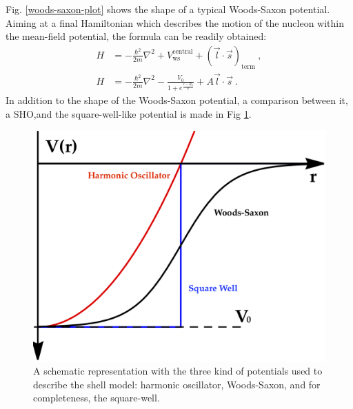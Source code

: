 Fig. \ref{woods-saxon-plot} shows the shape of a typical Woods-Saxon potential. Aiming at a final Hamiltonian which describes the motion of the nucleon within the mean-field potential, the formula can be readily obtained:
\begin{align}
    H&=-\frac{\hbar^2}{2m}\nabla^2+V_\text{ws}^\text{central}+(\vec{l}\cdot\vec{s})_\text{term}\ ,\\
    H&=-\frac{\hbar^2}{2m}\nabla^2-\frac{V_0}{1+e^{\frac{r-R_0}{a}}}+A\vec{l}\cdot\vec{s}\ .
\end{align}
In addition to the shape of the Woods-Saxon potential, a comparison between it, a SHO,and the square-well-like potential is made in Fig \ref{shell-model-functional-potentials}.
\begin{figure}
    \centering
    \includegraphics[scale=0.2]{Chapters/Figures/functional-potentials-shell-model.png}
    \caption{A schematic representation with the three kind of potentials used to describe the shell model: harmonic oscillator, Woods-Saxon, and for completeness, the square-well.}
    \label{shell-model-functional-potentials}
\end{figure}

